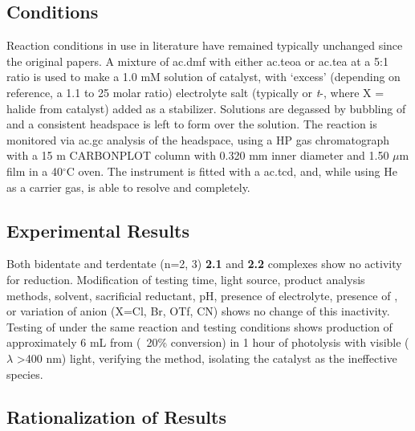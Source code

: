 \subsection{Conditions}

Reaction conditions in use in literature have remained typically unchanged since the original papers. A mixture of \gls{ac.dmf} with either \gls{ac.teoa} or \gls{ac.tea} at a 5:1 ratio is used to make a 1.0 mM solution of catalyst, with `excess' (depending on reference, a 1.1 to 25 molar ratio) electrolyte salt (typically  or \textit{t}-, where X = halide from catalyst) added as a stabilizer. Solutions are degassed by bubbling of  and a consistent headspace is left to form over the solution. The reaction is monitored via \gls{ac.gc} analysis of the headspace, using a HP gas chromatograph with a 15 m CARBONPLOT column with 0.320 mm inner diameter and 1.50 $\mu$m film in a 40$^\circ$C oven. The instrument is fitted with a \gls{ac.tcd}, and, while using He as a carrier gas, is able to resolve  and  completely.  

\subsection{Experimental Results}

Both bidentate and terdentate  (n=2, 3) \textbf{2.1} and \textbf{2.2} complexes show no activity for  reduction. Modification of testing time, light source, product analysis methods, solvent, sacrificial reductant, pH, presence of electrolyte, presence of , or variation of anion (X=Cl, Br, OTf, CN) shows no change of this inactivity. Testing of  under the same reaction and testing conditions shows production of approximately 6 mL  from  (~20\% conversion) in 1 hour of photolysis with visible ($\lambda$ \textgreater 400 nm) light, verifying the method, isolating the catalyst as the ineffective species. 

\subsection{Rationalization of Results}

